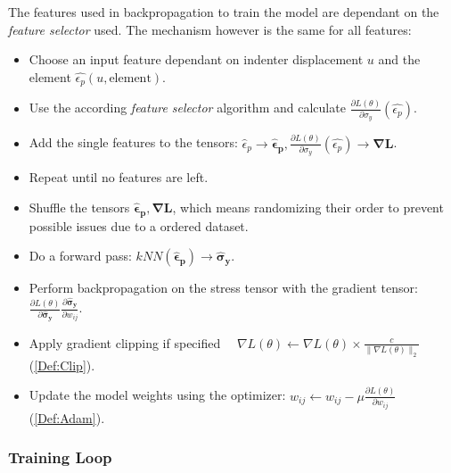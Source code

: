 The features used in backpropagation to train the model are dependant on the \textit{feature selector} used. The mechanism however is the same for all features:
\begin{itemize}
    \item Choose an input feature dependant on indenter displacement $u$ and the element $\hat{\epsilon_p}(u, \text{element})$.
    
    \item Use the according \textit{feature selector} algorithm and calculate
    $\frac{\partial L (\theta)}{\partial \sigma_y}(\hat{\epsilon_p})$.
    
    \item Add the single features to the tensors: $\hat{\epsilon}_p \rightarrow \boldsymbol{\hat{\epsilon}_p}, \frac{\partial L (\theta)}{\partial \sigma_y}(\hat{\epsilon_p})
    \rightarrow \boldsymbol{\nabla L}$.

    \item Repeat until no features are left.

    \item Shuffle the tensors $\boldsymbol{\hat{\epsilon}_p}, \boldsymbol{\nabla L}$, which means randomizing their order to prevent possible issues due to a ordered dataset.

    \item Do a forward pass: $kNN(\boldsymbol{\hat{\epsilon}_p}) \rightarrow \boldsymbol{\hat{\sigma}_y}$.

    \item Perform backpropagation on the stress tensor with the gradient tensor: $\frac{\partial L (\theta)}{\partial \boldsymbol{\hat{\sigma}_y}}
\frac{\partial \boldsymbol{\hat{\sigma}_y}}{\partial w_{ij}}$.

    \item Apply gradient clipping if specified $\quad \nabla L(\theta) \leftarrow \nabla L(\theta) \times \frac{c}{\|\nabla L(\theta)\|_2}$ (\ref{Def:Clip}).

    \item Update the model weights using the optimizer:  $w_{ij} \leftarrow w_{ij} - \mu \frac{\partial L (\theta)}{\partial w_{ij}}$ (\ref{Def:Adam}).
    
\end{itemize}




\subsubsection{Training Loop}

